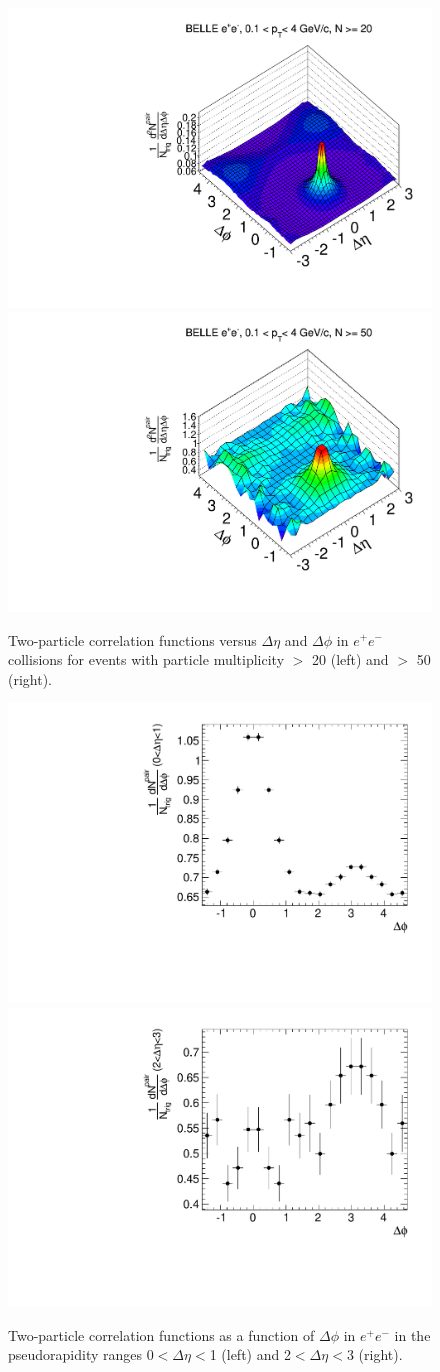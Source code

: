 \begin{figure}[!htb]
\begin{center}
\includegraphics[width=.45\textwidth]{figures/canvasRidgeBelleMult20CutHigh0.pdf}
\includegraphics[width=.45\textwidth]{figures/canvasRidgeBelleMult50CutHigh0.pdf}
\caption{Two-particle correlation functions versus $\Delta\eta$ and $\Delta\phi$ in $e^{+}e^{-}$ collisions for events with particle multiplicity $>$ 20 (left) and  $>$ 50 (right).}
\label{fig:ridgeBelle} 
\end{center}
\end{figure}

\begin{figure}[!htb]
\begin{center}
\includegraphics[width=.45\textwidth]{figures/canvasProjection_isBelle1_mult50_eta01.pdf}
\includegraphics[width=.45\textwidth]{figures/canvasProjection_isBelle1_mult50_eta23.pdf}
\caption{Two-particle correlation functions as a function of  $\Delta\phi$ in $e^{+}e^{-}$ in the pseudorapidity ranges 0$<\Delta \eta<$1 (left) and 2$<\Delta \eta<$3 (right).}
\label{fig:ProjectionMult50} 
\end{center}
\end{figure}

